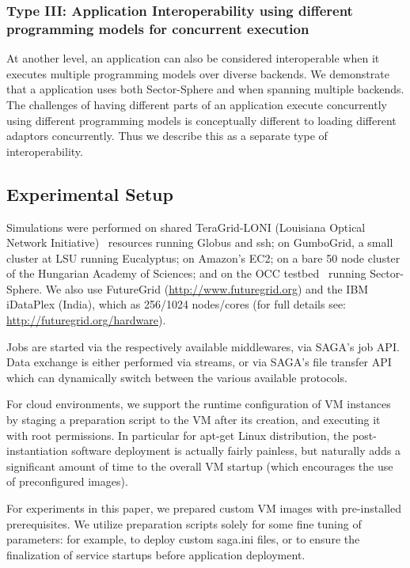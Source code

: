 \documentclass[3p,twocolumn]{elsarticle}
\begin{document}
\subsubsection{Type III: Application Interoperability using different
  programming models for concurrent execution}
%
%

At another level, an application can also be considered interoperable
when it executes multiple programming models  over
diverse backends.  We demonstrate that a \wc application uses both
Sector-Sphere and \smr when spanning  multiple backends.  The
challenges of having different parts of an application execute
concurrently using different programming models is conceptually
different to loading different adaptors concurrently. Thus we describe
this as a separate type of interoperability.

\subsection{Experimental Setup}

Simulations were performed on shared TeraGrid-LONI (Louisiana Optical
Network Initiative)~\cite{loni-url} resources running Globus and ssh;
on GumboGrid, a small cluster at LSU running Eucalyptus; on Amazon's
EC2; on a bare 50 node cluster of the Hungarian Academy of Sciences;
and on the OCC testbed~\cite{occ_testbed} running Sector-Sphere.  We
also use FutureGrid (\url{http://www.futuregrid.org}) and the IBM
iDataPlex (India), which as 256/1024 nodes/cores (for full details
see: \url{http://futuregrid.org/hardware}).

Jobs are started via the respectively available middlewares, via
SAGA's job API.  Data exchange is either performed via streams, or via
SAGA's file transfer API which can dynamically switch between the
various available protocols.

For cloud environments, we support the runtime configuration of VM
instances by staging a preparation script to the VM after its
creation, and executing it with root permissions.  In particular for
apt-get Linux distribution, the post-instantiation software deployment
is actually fairly painless, but naturally adds a significant amount
of time to the overall VM startup (which encourages the use of
preconfigured images).

For experiments in this paper, we prepared custom VM images with
pre-installed prerequisites.  We utilize preparation scripts solely
for some fine tuning of parameters: for example, to deploy custom
saga.ini files, or to ensure the finalization of service startups
before application deployment.
\end{document}
